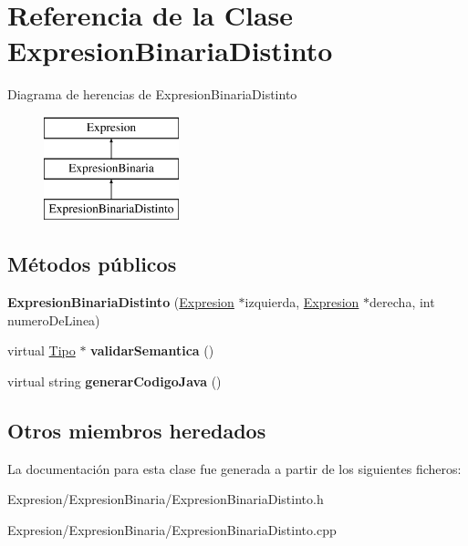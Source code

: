 \hypertarget{class_expresion_binaria_distinto}{\section{Referencia de la Clase Expresion\-Binaria\-Distinto}
\label{class_expresion_binaria_distinto}
}
Diagrama de herencias de Expresion\-Binaria\-Distinto\begin{figure}[H]
\begin{center}
\leavevmode
\includegraphics[height=3.000000cm]{class_expresion_binaria_distinto}
\end{center}
\end{figure}
\subsection*{Métodos públicos}
\begin{DoxyCompactItemize}
\item 
\hypertarget{class_expresion_binaria_distinto_a8f5d4b08dbf4eac2899d1e44e175b16c}{{\bfseries Expresion\-Binaria\-Distinto} (\hyperlink{class_expresion}{Expresion} $\ast$izquierda, \hyperlink{class_expresion}{Expresion} $\ast$derecha, int numero\-De\-Linea)}\label{class_expresion_binaria_distinto_a8f5d4b08dbf4eac2899d1e44e175b16c}

\item 
\hypertarget{class_expresion_binaria_distinto_ad1df37ee5fadedf3105b28cab2ef6486}{virtual \hyperlink{class_tipo}{Tipo} $\ast$ {\bfseries validar\-Semantica} ()}\label{class_expresion_binaria_distinto_ad1df37ee5fadedf3105b28cab2ef6486}

\item 
\hypertarget{class_expresion_binaria_distinto_a615a1cebbf16554ccc7c4b874a31a6f7}{virtual string {\bfseries generar\-Codigo\-Java} ()}\label{class_expresion_binaria_distinto_a615a1cebbf16554ccc7c4b874a31a6f7}

\end{DoxyCompactItemize}
\subsection*{Otros miembros heredados}


La documentación para esta clase fue generada a partir de los siguientes ficheros\-:\begin{DoxyCompactItemize}
\item 
Expresion/\-Expresion\-Binaria/Expresion\-Binaria\-Distinto.\-h\item 
Expresion/\-Expresion\-Binaria/Expresion\-Binaria\-Distinto.\-cpp\end{DoxyCompactItemize}
